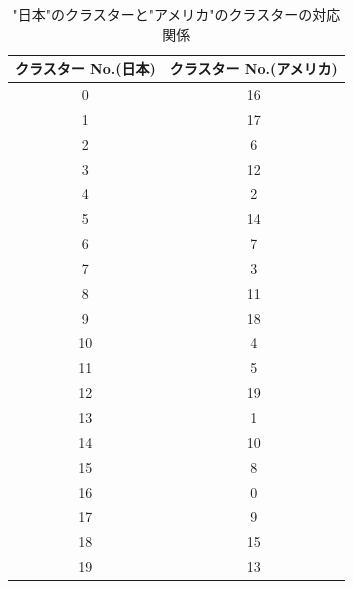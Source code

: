 \begin{table}[h]
  \caption["日本"のクラスターと"アメリカ"のクラスターの対応関係]{"日本"のクラスターと"アメリカ"のクラスターの対応関係}
  \label{}
  \begin{center}
    \begin{tabular}{|c||c|} \hline
      クラスター No.(日本) & クラスター No.(アメリカ) \\ \hline \hline
      0 & 16 \\
      1 & 17 \\
      2 & 6 \\
      3 & 12 \\
      4 & 2 \\
      5 & 14 \\
      6 & 7 \\
      7 & 3 \\
      8 & 11 \\
      9 & 18 \\ \hline
      10 & 4 \\
      11 & 5 \\
      12 & 19 \\
      13 & 1 \\
      14 & 10 \\
      15 & 8 \\
      16 & 0 \\
      17 & 9 \\
      18 & 15 \\
      19 & 13 \\ \hline
    \end{tabular}
  \end{center}
\end{table}

